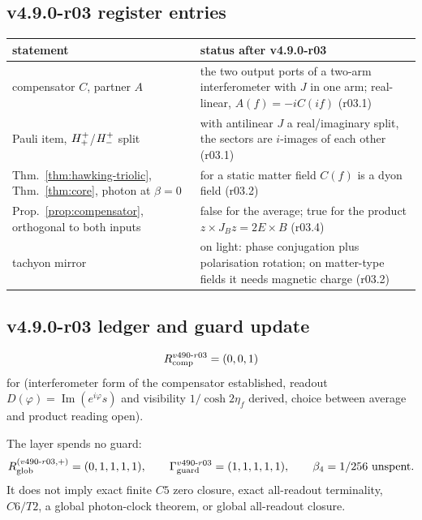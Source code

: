 \subsection*{v4.9.0-r03 register entries}
\label{subsec:v490-r03-register}

\begin{center}
\small
\begin{tabular}{@{}>{\raggedright\arraybackslash}p{}>{\raggedright\arraybackslash}p{}@{}}
\toprule
statement & status after v4.9.0-r03\\
\midrule
compensator \(C\), partner \(A\) & the two output ports of a two-arm interferometer with \(J\) in one arm; real-linear, \(A(f)=-iC(if)\) (r03.1)\\
Pauli item, \(H^+_+\)/\(H^+_-\) split & with antilinear \(J\) a real/imaginary split, the sectors are \(i\)-images of each other (r03.1)\\
Thm.~\ref{thm:hawking-triolic}, Thm.~\ref{thm:core}, photon at \(\beta=0\) & for a static matter field \(C(f)\) is a dyon field (r03.2)\\
Prop.~\ref{prop:compensator}, orthogonal to both inputs & false for the average; true for the product \(z\times J_Bz=2E\times B\) (r03.4)\\
tachyon mirror & on light: phase conjugation plus polarisation rotation; on matter-type fields it needs magnetic charge (r03.2)\\
\bottomrule
\end{tabular}
\end{center}

\subsection*{v4.9.0-r03 ledger and guard update}
\label{subsec:v490-r03-ledger-guard}

\[
R_{\rm comp}^{v490\text{-}r03}=(0,0,1)
\]
for (interferometer form of the compensator established, readout \(D(\varphi)=\operatorname{Im}(e^{i\varphi}s)\) and
visibility \(1/\cosh2\eta_f\) derived, choice between average and product reading open).

The layer spends no guard:
\[
R_{\rm glob}^{(v490\text{-}r03,+)}=(0,1,1,1,1),
\qquad
\Gamma_{\rm guard}^{v490\text{-}r03}=(1,1,1,1,1),
\qquad
\beta_4=1/256\ \text{unspent}.
\]
It does not imply exact finite \(C5\) zero closure, exact all-readout terminality,
\(C6/T2\), a global photon-clock theorem, or global all-readout closure.

